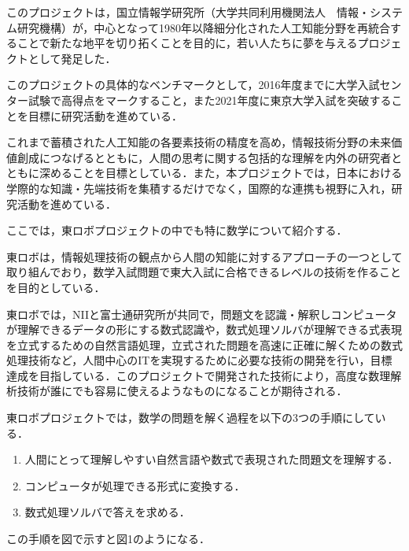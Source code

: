 このプロジェクトは，国立情報学研究所（大学共同利用機関法人　情報・システム研究機構）が，中心となって1980年以降細分化された人工知能分野を再統合することで新たな地平を切り拓くことを目的に，若い人たちに夢を与えるプロジェクトとして発足した\cite{tourobo}．

このプロジェクトの具体的なベンチマークとして，2016年度までに大学入試センター試験で高得点をマークすること，また2021年度に東京大学入試を突破することを目標に研究活動を進めている．

これまで蓄積された人工知能の各要素技術の精度を高め，情報技術分野の未来価値創成につなげるとともに，人間の思考に関する包括的な理解を内外の研究者とともに深めることを目標としている．また，本プロジェクトでは，日本における学際的な知識・先端技術を集積するだけでなく，国際的な連携も視野に入れ，研究活動を進めている．

\clearpage

ここでは，東ロボプロジェクトの中でも特に数学について紹介する．

東ロボは，情報処理技術の観点から人間の知能に対するアプローチの一つとして取り組んでおり，数学入試問題で東大入試に合格できるレベルの技術を作ることを目的としている．



東ロボでは，NIIと富士通研究所が共同で，問題文を認識・解釈しコンピュータが理解できるデータの形にする数式認識や，数式処理ソルバが理解できる式表現を立式するための自然言語処理，立式された問題を高速に正確に解くための数式処理技術など，人間中心のITを実現するために必要な技術の開発を行い，目標達成を目指している．このプロジェクトで開発された技術により，高度な数理解析技術が誰にでも容易に使えるようなものになることが期待される．

東ロボプロジェクトでは，数学の問題を解く過程を以下の3つの手順にしている．

\begin{enumerate}
\item 人間にとって理解しやすい自然言語や数式で表現された問題文を理解する．

\item コンピュータが処理できる形式に変換する．

\item 数式処理ソルバで答えを求める．
\end{enumerate}

この手順を図で示すと図1のようになる．

